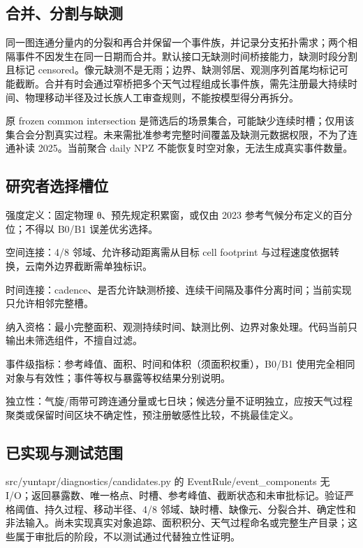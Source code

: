 \documentclass[UTF8,a4paper,10pt,fontset=fandol]{ctexart}
\begin{document}
\subsection*{合并、分割与缺测}

同一图连通分量内的分裂和再合并保留一个事件族，并记录分支拓扑需求；两个相隔事件不因发生在同一日期而合并。默认接口无缺测时间桥接能力，缺测时段分割且标记 censored。像元缺测不是无雨；边界、缺测邻居、观测序列首尾均标记可能截断。合并有时会通过窄桥把多个天气过程组成长事件族，需先注册最大持续时间、物理移动半径及过长族人工审查规则，不能按模型得分再拆分。\par

原 frozen common intersection 是筛选后的场景集合，可能缺少连续时槽；仅用该集合会分割真实过程。未来需批准参考完整时间覆盖及缺测元数据权限，不为了连通补读 2025。当前聚合 daily NPZ 不能恢复时空对象，无法生成真实事件数量。\par

\subsection*{研究者选择槽位}

\noindent\textbullet\quad 强度定义：固定物理 θ、预先规定积累窗，或仅由 2023 参考气候分布定义的百分位；不得以 B0/B1 误差优劣选择。\par
\noindent\textbullet\quad 空间连接：4/8 邻域、允许移动距离需从目标 cell footprint 与过程速度依据转换，云南外边界截断需单独标识。\par
\noindent\textbullet\quad 时间连接：cadence、是否允许缺测桥接、连续干间隔及事件分离时间；当前实现只允许相邻完整槽。\par
\noindent\textbullet\quad 纳入资格：最小完整面积、观测持续时间、缺测比例、边界对象处理。代码当前只输出未筛选组件，不擅自过滤。\par
\noindent\textbullet\quad 事件级指标：参考峰值、面积、时间和体积（须面积权重），B0/B1 使用完全相同对象与有效性；事件等权与暴露等权结果分别说明。\par
\noindent\textbullet\quad 独立性：气旋/雨带可跨连通分量或七日块；候选分量不证明独立，应按天气过程聚类或保留时间区块不确定性，预注册敏感性比较，不挑最佳定义。\par

\subsection*{已实现与测试范围}

src/yuntapr/diagnostics/candidates.py 的 EventRule/event\_components 无 I/O；返回暴露数、唯一格点、时槽、参考峰值、截断状态和未审批标记。验证严格阈值、持久过程、移动半径、4/8 邻域、缺时槽、缺像元、分裂合并、确定性和非法输入。尚未实现真实对象追踪、面积积分、天气过程命名或完整生产目录；这些属于审批后的阶段，不以测试通过代替独立性证明。\par
\end{document}

